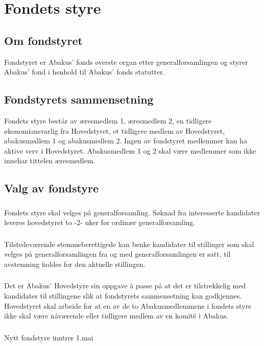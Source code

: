 \section{Fondets styre}
\subsection{Om fondstyret}
Fondstyret er Abakus’ fonds øverste organ etter generalforsamlingen og styrer
Abakus’ fond i henhold til Abakus’ fonds statutter.

\subsection{Fondstyrets sammensetning}
Fondets styre består av æresmedlem 1, æresmedlem 2, en tidligere økonomiansvarlig fra
Hovedstyret, et tidligere medlem av Hovedstyret, abakusmedlem 1 og abakusmedlem 2.
Ingen av fondstyret medlemmer kan ha aktive verv i Hovedstyret. Abakusmedlem 1 og 2 skal
være medlemmer som ikke innehar tittelen æresmedlem.

\subsection{Valg av fondstyre}
\subsubsection{}
Fondets styre skal velges på generalforsamling. Søknad fra interesserte kandidater
leveres hovedstyret to -2- uker før ordinær generalforsamling.

\subsubsection{}
Tilstedeværende stemmeberettigede kan benke kandidater til stillinger som skal velges
på generalforsamlingen fra og med generalforsamlingen er satt, til avstemning holdes for
den aktuelle stillingen.

\subsubsection{}
Det er Abakus’ Hovedstyre sin oppgave å passe på at det er tilstrekkelig med kandidater til
stillingene slik at fondstyrets sammensetning kan godkjennes. Hovedstyret skal arbeide for
at en av de to Abakusmedlemmene i fondets styre ikke skal være nåværende eller tidligere
medlem av en komité i Abakus.

\subsubsection{}
Nytt fondstyre inntrer 1.mai

